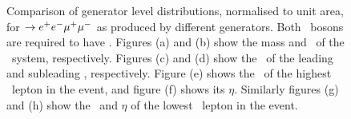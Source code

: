 \begin{figure}
{    }
        \vspace{-2mm}
        \vspace{-2mm}
    \caption{\small Comparison of generator level distributions, normalised to
    unit area, for \qqZZ $\rightarrow e^{+}e^{-}\mu^{+}\mu^{-}$ as produced by different generators. Both 
    \Z\ bosons
    are required to have \sstooos. Figures (a)
    and (b) show the mass and \pt\ of the \ZZ\ system,
    respectively. Figures (c) and (d) show the \pt\ of the
    leading and subleading \Z, respectively. Figure (e) shows the \pt\ of the highest \pt\ lepton in the event, and figure (f) shows its
   $\eta$. Similarly figures (g) and (h) show the \pt\ and $\eta$ of the lowest
   \pt\ lepton in the event.}
    \label{fig:gen-comp-ZZ}
\end{figure}

